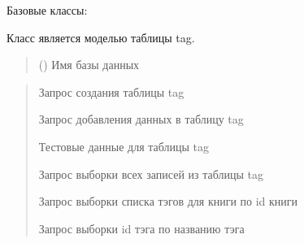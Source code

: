 \documentclass[letterpaper,10pt,russian]{sphinxmanual}
\begin{document}
\begin{fulllineitems}
\label{\detokenize{database.sqlite3_interface.tables:database.sqlite3_interface.tables.tag.Tag}}
\pysigstartsignatures
{}
\pysigstopsignatures
\sphinxAtStartPar
Базовые классы: {\hyperref[\detokenize{database.sqlite3_interface.tables:database.sqlite3_interface.tables.table.Table}]{}}

\sphinxAtStartPar
Класс является моделью таблицы tag.
\begin{quote}\begin{description}
\sphinxAtStartPar
{} () \textendash{} Имя базы данных

\end{description}\end{quote}
\begin{description}
\begin{quote}\begin{description}
\sphinxAtStartPar
Запрос создания таблицы tag

\sphinxAtStartPar
Запрос добавления данных в таблицу tag

\sphinxAtStartPar
Тестовые данные для таблицы tag

\sphinxAtStartPar
Запрос выборки всех записей из таблицы tag

\sphinxAtStartPar
Запрос выборки списка тэгов для книги по id книги

\sphinxAtStartPar
Запрос выборки id тэга по названию тэга

\end{description}\end{quote}

\begin{sphinxVerbatim}[commandchars=\\\{\}]
\end{sphinxVerbatim}


\end{description}
\end{fulllineitems}
\end{document}
